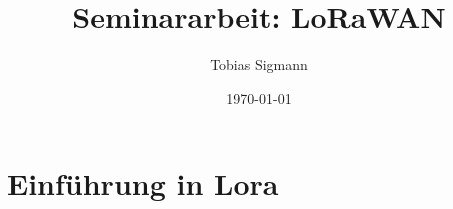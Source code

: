 \documentclass[a4paper,12pt]{article}
\author{Tobias Sigmann}
\title{Seminararbeit: LoRaWAN}
\date{\today}
\begin{document}
    \maketitle
    \newpage
    \tableofcontents
    \newpage

    \section{Einführung in Lora}
        
        
        

\end{document}

